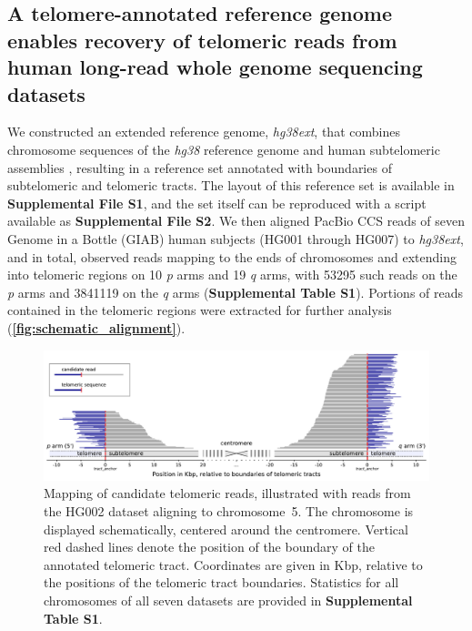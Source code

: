 \documentclass{article}
\begin{document}
\subsection*{A telomere-annotated reference genome enables recovery of telomeric reads from human long-read whole genome sequencing datasets}
    We constructed an extended reference genome, \textit{hg38ext},
        that combines chromosome sequences of the \textit{hg38} reference genome \cite{grch38,hg38}
            and human subtelomeric assemblies \cite{riethman2014},
        resulting in a reference set annotated with boundaries of subtelomeric and telomeric tracts.
        The layout of this reference set is available in \textbf{Supplemental File S1},
            and the set itself can be reproduced with a script available as \textbf{Supplemental File S2}.
    We then aligned PacBio CCS reads of seven Genome in a Bottle (GIAB) human subjects (HG001 through HG007) to \textit{hg38ext},
        and in total, observed reads mapping to the ends of chromosomes and extending into telomeric regions
            on 10 \textit{p} arms and 19 \textit{q} arms,
                with 53\textendash{}295 such reads on the \textit{p} arms
                and 384\textendash{}1119 on the \textit{q} arms
                    (\textbf{Supplemental Table S1}).
    Portions of reads contained in the telomeric regions were extracted for further analysis (\textbf{\autoref{fig:schematic_alignment}}).
        \begin{figure}[h!] \centering %
        \includegraphics[height=.75\textheight,width=\textwidth,keepaspectratio]{renders/figures/Figure-1.pdf}
        \caption{
             \small Mapping of candidate telomeric reads, illustrated with reads from the HG002 dataset aligning to \mbox{chromosome 5.}
             The chromosome is displayed schematically, centered around the centromere.
             Vertical red dashed lines denote the position of the boundary of the annotated telomeric tract.
             Coordinates are given in Kbp, relative to the positions of the telomeric tract boundaries.
             Statistics for all chromosomes of all seven datasets are provided in \textbf{Supplemental Table S1}.
        }
        \label{fig:schematic_alignment}
        \end{figure}
\end{document}
